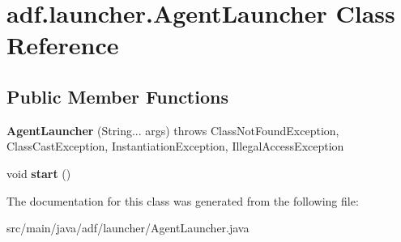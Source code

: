 \hypertarget{classadf_1_1launcher_1_1AgentLauncher}{}\section{adf.\+launcher.\+Agent\+Launcher Class Reference}
\label{classadf_1_1launcher_1_1AgentLauncher}
\subsection*{Public Member Functions}
\begin{DoxyCompactItemize}
\item 
\hypertarget{classadf_1_1launcher_1_1AgentLauncher_af70a64943f3e3dc9af62f53f8aa110b5}{}\label{classadf_1_1launcher_1_1AgentLauncher_af70a64943f3e3dc9af62f53f8aa110b5} 
{\bfseries Agent\+Launcher} (String... args)  throws Class\+Not\+Found\+Exception, Class\+Cast\+Exception, Instantiation\+Exception, Illegal\+Access\+Exception     
\item 
\hypertarget{classadf_1_1launcher_1_1AgentLauncher_a949d5a6d55b71cb5fb7e3508e888499a}{}\label{classadf_1_1launcher_1_1AgentLauncher_a949d5a6d55b71cb5fb7e3508e888499a} 
void {\bfseries start} ()
\end{DoxyCompactItemize}


The documentation for this class was generated from the following file\+:\begin{DoxyCompactItemize}
\item 
src/main/java/adf/launcher/Agent\+Launcher.\+java\end{DoxyCompactItemize}
